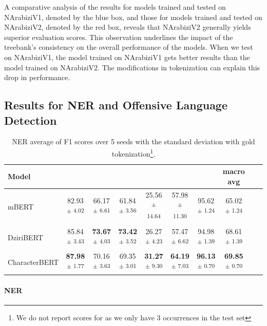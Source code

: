 \documentclass[11pt]{article}
\newcommand{\org}{{\sc {\tt ORG}}\xspace}
\newcommand{\loc}{{\sc {\tt LOC}}\xspace}
\newcommand{\comp}{{\sc {\tt COMP}}\xspace}
\newcommand{\perderiva}{{\sc {\tt PERderivA}}\xspace}
\newcommand{\perderiv}{{\sc {\tt PERderiv}}\xspace}
\newcommand{\per}{{\sc {\tt PER}}\xspace}
\newcommand{\oth}{{\sc {\tt OTH}}\xspace}
\begin{document}
A comparative analysis of the results for models trained and tested on NArabiziV1, denoted by the blue box, and those for models trained and tested on NArabiziV2, denoted by the red box, reveals that NArabiziV2 generally yields superior evaluation scores. This observation underlines the impact of the treebank's consistency on the overall performance of the models. When we test on NArabiziV1, the model trained on NArabiziV1 gets better results than the model trained on NArabiziV2. The modifications in tokenization can explain this drop in performance.

\subsection{Results for NER and Offensive Language Detection}
\begin{table}[h!]
\centering
    \footnotesize
\begin{tabular}{lccccccccc}
\toprule
Model & \loc & \org & \per & \oth & \perderiv & \perderiva & macro avg\\
\midrule
mBERT & 82.93 \textsuperscript{$\pm$ 4.02} & 66.17 \textsuperscript{$\pm$ 6.61} & 61.84 \textsuperscript{$\pm$ 3.56} & 25.56 \textsuperscript{$\pm$ 14.64} & 57.98 \textsuperscript{$\pm$ 11.30} & 95.62 \textsuperscript{$\pm$ 1.24}  & 65.02 \textsuperscript{$\pm$ 1.24}\\
DziriBERT & 85.84 \textsuperscript{$\pm$ 3.43} & \textbf{73.67} \textsuperscript{$\pm$ 4.03} & \textbf{73.42} \textsuperscript{$\pm$ 3.52} & 26.27 \textsuperscript{$\pm$ 4.23} & 57.47 \textsuperscript{$\pm$ 6.62} & 94.98 \textsuperscript{$\pm$ 1.39} & 68.61 \textsuperscript{$\pm$ 1.39} \\
 CharacterBERT   & \textbf{87.98} \textsuperscript{$\pm$ 1.77} & 70.16 \textsuperscript{$\pm$ 3.63} & 69.35 \textsuperscript{$\pm$ 3.01} & \textbf{31.27} \textsuperscript{$\pm$ 9.30} & \textbf{64.19} \textsuperscript{$\pm$ 7.03} & \textbf{96.13} \textsuperscript{$\pm$ 0.70}   & \textbf{69.85} \textsuperscript{$\pm$ 0.70}  \\
\bottomrule
\end{tabular}
\caption{NER average of F1 scores over 5 seeds with the standard deviation with gold tokenization\footnote{We do not report scores for \comp as we only have 3 occurrences in the test set}.}
\label{table:f1-scores-ner-all-tags}
\end{table}

\paragraph{NER}
\end{document}
